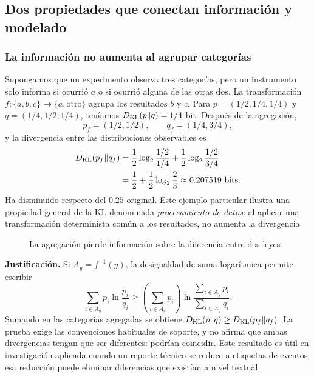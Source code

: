 \subsection{Dos propiedades que conectan información y modelado}


\subsubsection*{La información no aumenta al agrupar categorías}

Supongamos que un experimento observa tres categorías, pero un instrumento
solo informa si ocurrió $a$ o si ocurrió alguna de las otras dos.
La transformación $f: \{a,b,c\}\to\{a,\mathrm{otro}\}$ agrupa
los resultados $b$ y $c$. Para
$p=(1/2,1/4,1/4)$ y $q=(1/4,1/2,1/4)$, teníamos
$D_{\rm KL}(p\|q)=1/4$ bit. Después de la agregación,
\[
 p_f=(1/2,1/2),\qquad q_f=(1/4,3/4),
\]
y la divergencia entre las distribuciones observables es
\[
\begin{split}
D_{\rm KL}(p_f\|q_f)
&=\frac12\log_2\frac{1/2}{1/4}
+\frac12\log_2\frac{1/2}{3/4}\\
&=\frac12+\frac12\log_2\frac23
\approx0.207519\ \text{bits}.
\end{split}
\]
Ha disminuido respecto del $0.25$ original. Este ejemplo particular
ilustra una propiedad general de la KL denominada \emph{procesamiento de
datos}: al aplicar una transformación determinista común a los
resultados, no aumenta la divergencia.

\begin{figure}[H]\centering
{}
\caption{La agregación pierde información sobre la diferencia entre dos leyes.}
\end{figure}

\textbf{Justificación.} Si $A_y=f^{-1}(y)$, la desigualdad de suma logarítmica
permite escribir
\[
\sum_{i\in A_y}p_i\ln\frac{p_i}{q_i}
\ge\left(\sum_{i\in A_y}p_i\right)
\ln\frac{\sum_{i\in A_y}p_i}{\sum_{i\in A_y}q_i}.
\]
Sumando en las categorías agregadas se obtiene
$D_{\rm KL}(p\|q)\ge D_{\rm KL}(p_f\|q_f)$.
La prueba exige las convenciones habituales de soporte, y no afirma
que ambas divergencias tengan que ser diferentes: podrían coincidir.
Este resultado es útil en investigación aplicada cuando un reporte
técnico se reduce a etiquetas de eventos; esa reducción puede eliminar
diferencias que existían a nivel textual.

